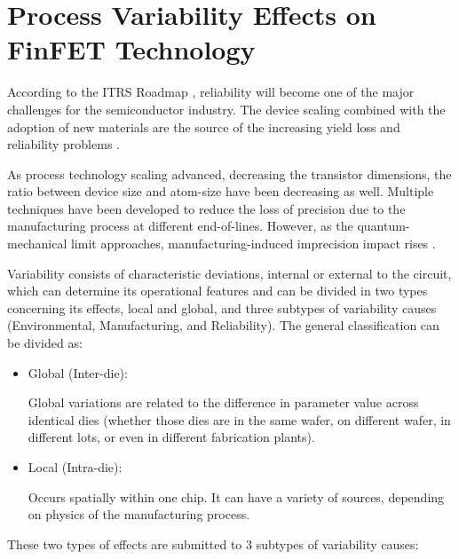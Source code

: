 \documentclass[pgmicro,diss,english]{iiufrgs}
\begin{document}
\chapter{Process Variability Effects on FinFET Technology}

According to the ITRS Roadmap \cite{blish2003critical}, reliability will become one of the major challenges for the semiconductor industry. The device scaling combined with the adoption of new materials are the source of the increasing yield loss and reliability problems \cite{gielen2008emerging}.

As process technology scaling advanced, decreasing the transistor dimensions, the ratio between device size and atom-size have been decreasing as well. Multiple techniques have been developed to reduce the loss of precision due to the manufacturing process at different end-of-lines. However, as the quantum-mechanical limit approaches, manufacturing-induced imprecision impact rises \cite{asenov1999random} \cite{neuberger2014protecting}.

Variability consists of characteristic deviations, internal or external to the circuit, which can determine its operational features and can be divided in two types concerning its effects, local and global, and three subtypes of variability causes (Environmental, Manufacturing, and Reliability). The general classification can be divided as:

\begin{itemize}

\item Global (Inter-die):

	Global variations are related to the difference in parameter value across identical dies (whether those dies are in the same wafer, on different wafer, in different lots, or even in different fabrication plants).

\item Local (Intra-die):

	Occurs spatially within one chip. It can have a variety of sources, depending on physics of the manufacturing process.

\end{itemize}

	These two types of effects are submitted to 3 subtypes of variability causes:
\end{document}
